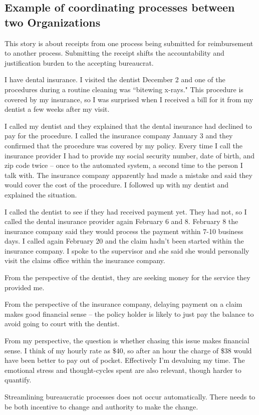 \subsection*{Example of coordinating processes between two Organizations}
This story is about receipts from one process being submitted for reimbursement to another process.
Submitting the receipt shifts the accountability and justification burden to the accepting bureaucrat.

\begin{mdframed}
I have dental insurance. I visited the dentist December 2 and one of the procedures during a routine cleaning was ``bitewing x-rays." This procedure is covered by my insurance, so I was surprised when I received a bill for it from my dentist a few weeks after my visit.

I called my dentist and they explained that the dental insurance had declined to pay for the procedure. I called the insurance company January 3 and they confirmed that the procedure was covered by my policy. 
Every time I call the insurance provider I had to provide my social security number, date of birth, and zip code twice -- once to the automated system, a second time to the person I talk with. The insurance company apparently had made a mistake and said they would cover the cost of the procedure. I followed up with my dentist and explained the situation.

I called the dentist to see if they had received payment yet. They had not, so I called the dental insurance provider again February 6 and 8. February 8 the insurance company said they would process the payment within 7-10 business days. I called again February 20 and the claim hadn't been started within the insurance company. I spoke to the supervisor and she said she would personally visit the claims office within the insurance company.

From the perspective of the dentist, they are seeking money for the service they provided me.

From the perspective of the insurance company, delaying payment on a claim makes good financial sense -- the policy holder is likely to just pay the balance to avoid going to court with the dentist.

From my perspective, the question is whether chasing this issue makes financial sense. I think of my hourly rate as \$40, so after an hour the charge of \$38 would have been better to pay out of pocket. Effectively I'm devaluing my time. The emotional stress and thought-cycles spent are also relevant, though harder to quantify.

Streamlining bureaucratic processes does not occur automatically. There needs to be both incentive to change and authority to make the change. 
\end{mdframed}

